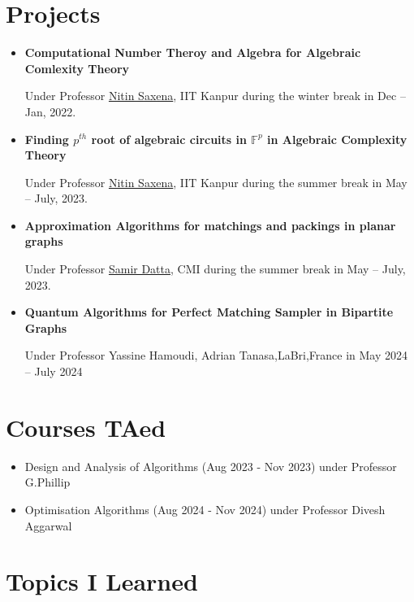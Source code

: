 \documentclass[10pt,a4paper,sans,colorlinks]{moderncv}        %
\begin{document}
	\section{Projects}
	\begin{itemize}
		
		
		\item \textbf{Computational Number Theroy and Algebra for Algebraic Comlexity Theory }
		
		\hfill Under Professor \href{https://www.cse.iitk.ac.in/users/nitin/}{Nitin Saxena}, IIT Kanpur during the winter break in Dec -- Jan, 2022.
		
		\item \textbf{Finding $p^{th}$ root of algebraic circuits in $\mathbb{F}^p$ in Algebraic Complexity Theory }
		
		\hfill Under Professor \href{https://www.cse.iitk.ac.in/users/nitin/}{Nitin Saxena}, IIT Kanpur during the summer break in May -- July, 2023.
		
		\item \textbf{Approximation Algorithms for matchings and packings in planar graphs}
		
		\hfill Under Professor \href{https://www.cmi.ac.in/~sdatta/}{Samir Datta}, CMI during the summer break in May -- July, 2023.
		\item \textbf{Quantum Algorithms for Perfect Matching Sampler in Bipartite Graphs}
		
		\hfill Under Professor Yassine Hamoudi, Adrian Tanasa,LaBri,France in May 2024 -- July 2024
		
	\end{itemize}

\section{Courses TAed}
\begin{itemize}
	\item Design and Analysis of Algorithms (Aug 2023 - Nov 2023) under Professor G.Phillip
	\item Optimisation Algorithms (Aug 2024 - Nov 2024) under Professor Divesh Aggarwal
\end{itemize}

	
	\section{Topics I Learned}
	
	
	
\end{document}
